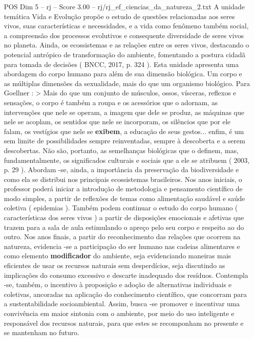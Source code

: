 \begin{textsample}{POS Dim 5 – rj – Score 3.00 – rj/rj\_ef\_ciencias\_da\_natureza\_2.txt}
A unidade temática Vida e Evolução propõe o estudo de questões relacionadas aos seres vivos, suas características e necessidades, e a vida como fenômeno também social, a compreensão dos processos evolutivos e consequente diversidade de seres vivos no planeta.
Ainda, os ecossistemas e as relações entre os seres vivos, destacando o potencial antrópico de transformação do ambiente, fomentando a postura cidadã para tomada de decisões ( BNCC, 2017, p. 324 ).
Esta unidade apresenta uma abordagem do corpo humano para além de sua dimensão biológica.
Um corpo e as múltiplas dimensões da sexualidade, mais do que um organismo biológico.
Para Goellner : > Mais do que um conjunto de músculos, ossos, vísceras, reflexos e sensações, o corpo é também a roupa e os acessórios que o adornam, as intervenções que nele se operam, a imagem que dele se produz, as máquinas que nele se acoplam, os sentidos que nele se incorporam, os silêncios que por ele falam, os vestígios que nele se \textbf{exibem}, a educação de seus gestos... enfim, é um sem limite de possibilidades sempre reinventadas, sempre à descoberta e a serem descobertas.
Não são, portanto, as semelhanças biológicas que o definem, mas, fundamentalmente, os significados culturais e sociais que a ele se atribuem ( 2003, p. 29 ).
Abordam -se, ainda, a importância da preservação da biodiversidade e como ela se distribui nos principais ecossistemas brasileiros.
Nos anos iniciais, o professor poderá iniciar a introdução de metodologia e pensamento científico de modo simples, a partir de reflexões de temas como alimentação saudável e saúde coletiva ( epidemias ).
Também podem continuar o estudo do corpo humano ( características dos seres vivos ) a partir de disposições emocionais e afetivas que trazem para a sala de aula estimulando o apreço pelo seu corpo e respeito ao do outro.
Nos anos finais, a partir do reconhecimento das relações que ocorrem na natureza, evidencia -se a participação do ser humano nas cadeias alimentares e como elemento \textbf{modificador} do ambiente, seja evidenciando maneiras mais eficientes de usar os recursos naturais sem desperdícios, seja discutindo as implicações do consumo excessivo e descarte inadequado dos resíduos.
Contempla -se, também, o incentivo à proposição e adoção de alternativas individuais e coletivas, ancoradas na aplicação do conhecimento científico, que concorram para a sustentabilidade socioambiental.
Assim, busca -se promover e incentivar uma convivência em maior sintonia com o ambiente, por meio do uso inteligente e responsável dos recursos naturais, para que estes se recomponham no presente e se mantenham no futuro.

\end{textsample}
